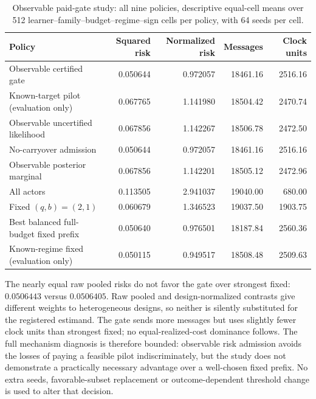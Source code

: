 \begin{table}[t]
\centering
\caption{Observable paid-gate study: all nine policies, descriptive equal-cell means over 512 learner--family--budget--regime--sign cells per policy, with 64 seeds per cell.}
\label{tab:observable-all-policies}
\begin{tabular}{lrrrr}
\toprule
Policy & Squared risk & Normalized risk & Messages & Clock units\\
\midrule
Observable certified gate&0.050644&0.972057&18461.16&2516.16\\
Known-target pilot (evaluation only)&0.067765&1.141980&18504.42&2470.74\\
Observable uncertified likelihood&0.067856&1.142267&18506.78&2472.50\\
No-carryover admission&0.050644&0.972057&18461.16&2516.16\\
Observable posterior marginal&0.067856&1.142201&18505.12&2472.96\\
All actors&0.113505&2.941037&19040.00&680.00\\
Fixed $(q,b)=(2,1)$&0.060679&1.346523&19037.50&1903.75\\
Best balanced full-budget fixed prefix&0.050640&0.976501&18187.84&2560.36\\
Known-regime fixed (evaluation only)&0.050115&0.949517&18508.48&2509.63\\
\bottomrule
\end{tabular}
\end{table}

The nearly equal raw pooled risks do not favor the gate over strongest fixed: $0.0506443$ versus $0.0506405$.
Raw pooled and design-normalized contrasts give different weights to heterogeneous designs, so neither is silently substituted for the registered estimand.
The gate sends more messages but uses slightly fewer clock units than strongest fixed; no equal-realized-cost dominance follows.
The full mechanism diagnosis is therefore bounded: observable risk admission avoids the losses of paying a feasible pilot indiscriminately, but the study does not demonstrate a practically necessary advantage over a well-chosen fixed prefix.
No extra seeds, favorable-subset replacement or outcome-dependent threshold change is used to alter that decision.

